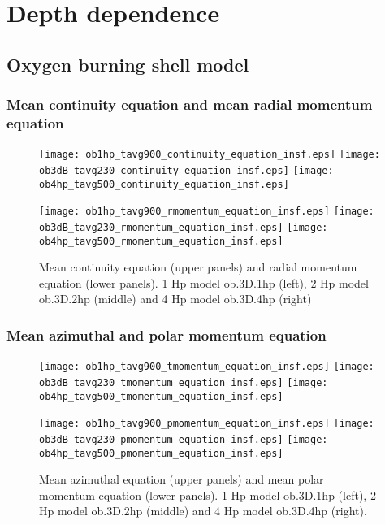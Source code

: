 \documentclass[10pt,paper=a4]{report}
\begin{document}
\section{Depth dependence}

\subsection{Oxygen burning shell model}

\subsubsection{Mean continuity equation and mean radial momentum equation}

\begin{figure}[!h]
\centerline{
\texttt{[image: ob1hp\_tavg900\_continuity\_equation\_insf.eps]}
\texttt{[image: ob3dB\_tavg230\_continuity\_equation\_insf.eps]}
\texttt{[image: ob4hp\_tavg500\_continuity\_equation\_insf.eps]}}

\centerline{
\texttt{[image: ob1hp\_tavg900\_rmomentum\_equation\_insf.eps]}
\texttt{[image: ob3dB\_tavg230\_rmomentum\_equation\_insf.eps]}
\texttt{[image: ob4hp\_tavg500\_rmomentum\_equation\_insf.eps]}}
\caption{Mean continuity equation (upper panels) and radial momentum equation (lower panels). 1 Hp model {\sf ob.3D.1hp} (left), 2 Hp model {\sf ob.3D.2hp} (middle) and 4 Hp model {\sf ob.3D.4hp} (right)}
\end{figure}

\newpage

\subsubsection{Mean azimuthal and polar momentum equation}

\begin{figure}[!h]
\centerline{
\texttt{[image: ob1hp\_tavg900\_tmomentum\_equation\_insf.eps]}
\texttt{[image: ob3dB\_tavg230\_tmomentum\_equation\_insf.eps]}
\texttt{[image: ob4hp\_tavg500\_tmomentum\_equation\_insf.eps]}}

\centerline{
\texttt{[image: ob1hp\_tavg900\_pmomentum\_equation\_insf.eps]}
\texttt{[image: ob3dB\_tavg230\_pmomentum\_equation\_insf.eps]}
\texttt{[image: ob4hp\_tavg500\_pmomentum\_equation\_insf.eps]}}
\caption{Mean azimuthal equation (upper panels) and mean polar momentum equation (lower panels). 1 Hp model {\sf ob.3D.1hp} (left), 2 Hp model {\sf ob.3D.2hp} (middle) and 4 Hp model {\sf ob.3D.4hp} (right).}
\end{figure}
\end{document}
